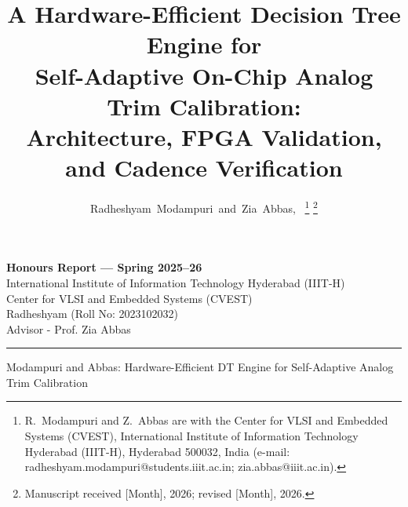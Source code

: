 \documentclass[lettersize,journal]{IEEEtran}
\begin{document}
\begin{center}
{\Large\bfseries Honours Report --- Spring 2025--26}\\[4pt]
{\large International Institute of Information Technology Hyderabad (IIIT-H)}\\[2pt]
{\large Center for VLSI and Embedded Systems (CVEST)}\\[10pt]
{ Radheshyam (Roll No: 2023102032)}\\[4pt]
{ Advisor - Prof. Zia Abbas}
\end{center}
\hrule
\vspace{6pt}

\title{A Hardware-Efficient Decision Tree Engine for\\Self-Adaptive On-Chip Analog Trim Calibration:\\Architecture, FPGA Validation, and Cadence Verification}

\author{Radheshyam~Modampuri~and~Zia~Abbas,~
\thanks{R.~Modampuri and Z.~Abbas are with the Center for VLSI and Embedded Systems (CVEST), International Institute of Information Technology Hyderabad (IIIT-H), Hyderabad 500032, India (e-mail: radheshyam.modampuri@students.iiit.ac.in; zia.abbas@iiit.ac.in).}%
\thanks{Manuscript received [Month], 2026; revised [Month], 2026.}}

%
{Modampuri and Abbas: Hardware-Efficient DT Engine for Self-Adaptive Analog Trim Calibration}

\maketitle
\end{document}
